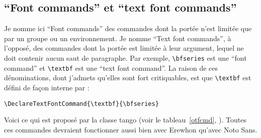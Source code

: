 \documentclass[french,ColorTheme=USAF,FontSize=10pt]{tango}
\begin{document}
\subsection{“Font commands” et “text font commands”}
Je nomme ici  “Font commands”  des commandes  dont la portée n'est limitée que par un groupe ou un environnement. Je nomme “Text font commands”, à l'opposé, des commandes dont la portée est limitée à leur argument, lequel ne doit contenir aucun saut de paragraphe. Par exemple, \verb=\bfseries= est une “font command” et \verb=\textbf= est une “text font command”. La raison de ces dénominations, dont j'admets qu'elles sont fort critiquables, est que \verb+\textbf+ est défini de façon interne par :
\begin{tcolorbox}
\begin{verbatim}
\DeclareTextFontCommand{\textbf}{\bfseries}
\end{verbatim}
\end{tcolorbox}

Voici ce qui est proposé par la classe tango (voir le tableau~\ref{otfcmd}, \pageref{otfcmd}). Toutes ces commandes devraient fonctionner aussi bien avec Erewhon qu'avec Noto Sans.
\end{document}
